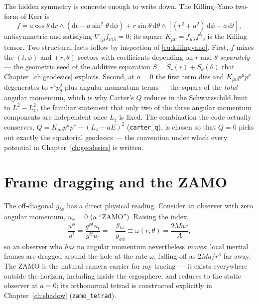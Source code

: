 The hidden symmetry is concrete enough to write down. The Killing--Yano
two-form of Kerr is \citep{Penrose1969, Chandrasekhar1983}
\begin{equation}
f = a\cos\theta\,\mathrm{d}r\wedge
    \left(\mathrm{d}t - a\sin^2\theta\,\mathrm{d}\phi\right)
  + r\sin\theta\,\mathrm{d}\theta\wedge
    \left[(r^2+a^2)\,\mathrm{d}\phi - a\,\mathrm{d}t\right],
\label{eq:killingyano}
\end{equation}
antisymmetric and satisfying $\nabla_{(\mu}f_{\nu)\lambda} = 0$; its
square $K_{\mu\nu} = f_{\mu\lambda}f^\lambda{}_\nu$ is the Killing
tensor. Two structural facts follow by inspection of
\eqref{eq:killingyano}. First, $f$ mixes the $(t,\phi)$ and
$(r,\theta)$ sectors with coefficients depending on $r$ and $\theta$
\emph{separately} — the geometric seed of the additive separation
$S = S_r(r) + S_\theta(\theta)$ that Chapter~\ref{ch:geodesics}
exploits. Second, at $a = 0$ the first term dies and
$K_{\mu\nu}p^\mu p^\nu$ degenerates to $r^4 p_\theta^2$ plus angular
momentum terms — the square of the \emph{total} angular momentum, which
is why Carter's $Q$ reduces in the Schwarzschild limit to
$L^2 - L_z^2$, the familiar statement that only two of the three
angular momentum components are independent once $L_z$ is fixed. The
combination the code actually conserves,
$Q = K_{\mu\nu}p^\mu p^\nu - (L_z - aE)^2$
(\texttt{carter\_q}), is chosen so that $Q = 0$ picks out exactly the
equatorial geodesics — the convention under which every potential in
Chapter~\ref{ch:geodesics} is written.

\section{Frame dragging and the ZAMO}
\label{sec:zamo}

The off-diagonal $g_{t\phi}$ has a direct physical reading. Consider an
observer with zero angular momentum, $u_\phi = 0$ (a ``ZAMO''). Raising
the index,
\begin{equation}
\frac{u^\phi}{u^t} = \frac{g^{\phi t}u_t}{g^{tt}u_t}
= -\frac{g_{t\phi}}{g_{\phi\phi}} \equiv \omega(r, \theta)
= \frac{2Mar}{A},
\label{eq:omega-drag}
\end{equation}
so an observer who \emph{has} no angular momentum nevertheless
\emph{moves}: local inertial frames are dragged around the hole at the
rate $\omega$, falling off as $2Ma/r^3$ far away. The ZAMO is the natural
camera carrier for ray tracing — it exists everywhere outside the
horizon, including inside the ergosphere, and reduces to the static
observer at $a = 0$; its orthonormal tetrad is constructed explicitly in
Chapter~\ref{ch:shadow} (\texttt{zamo\_tetrad}).

